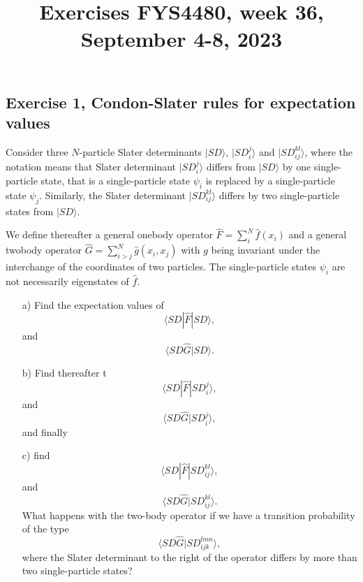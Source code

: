 \documentclass[prc]{revtex4}
\begin{document}
\title{Exercises FYS4480, week 36, September 4-8, 2023}
\maketitle
\subsection*{Exercise 1, Condon-Slater rules for expectation values}
Consider three $N$-particle 
Slater determinants $|SD\rangle$, $|SD_i^j\rangle$ and $|SD_{ij}^{kl}\rangle$, where the notation means that 
Slater determinant $|SD_i^j\rangle$ differs from $|SD\rangle$ by one single-particle state, that is a single-particle
state $\psi_i$ is replaced by a single-particle state $\psi_j$. Similarly, the Slater determinant $|SD_{ij}^{kl}\rangle$
differs by two single-particle states from $|SD\rangle$.

We define thereafter a general onebody operator $\hat{F} = \sum_{i}^N\hat{f}(x_{i})$ and a general 
twobody operator $\hat{G}=\sum_{i>j}^N\hat{g}(x_{i},x_{j})$
with $g$ being invariant under the interchange of the coordinates of two particles.
The single-particle states $\psi_i$ are not necessarily eigenstates of $\hat{f}$.
\begin{enumerate}
\item[a)] Find the expectation values of 
\[
\langle SD |\hat{F}|SD\rangle,
\]
and
\[
\langle SD\hat{G}|SD\rangle.
\]
\item[b)] Find thereafter t
\[
\langle SD |\hat{F}|SD_i^j\rangle,
\]
and
\[
\langle SD\hat{G}|SD_i^j\rangle,
\]
and finally
\item[c)] find 
\[
\langle SD |\hat{F}|SD_{ij}^{kl}\rangle,
\]
and
\[
\langle SD\hat{G}|SD_{ij}^{kl}\rangle.
\]
What happens with the two-body operator if we have a transition probability  of the type
\[
\langle SD\hat{G}|SD_{ijk}^{lmn}\rangle,
\]
where the Slater determinant to the right of the operator differs by more than two single-particle states?
\end{enumerate}
\end{document}
